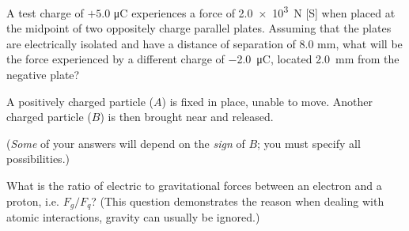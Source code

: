 \documentclass{../../ossphysics}
\begin{document}
\begin{questions}
  
  \question A test charge of $+5.0$ \si{\micro\coulomb} experiences a force of
  \SI{2.0e3}{\newton} [S] when placed at the midpoint of two oppositely
  charge parallel plates. Assuming that the plates are electrically isolated
  and have a distance of separation of 8.0 mm, what will be the
  force experienced by a different charge of \SI{-2.0}{\micro\coulomb}, located
  \SI{2.0}{\milli\metre} from the negative plate?
  \vspace{\stretch1}
  
  

  
  \question A positively charged particle ($A$) is fixed in place, unable to
  move. Another charged particle ($B$) is then brought near and released. 
  (\emph{Some} of your answers will depend on the \emph{sign} of $B$;
  you must specify all possibilities.)
  \newpage
  
  \question What is the ratio of electric to gravitational forces between an
  electron and a proton, i.e. $F_g/F_q$? (This question demonstrates the reason
  when dealing with atomic interactions, gravity can usually be ignored.)


\end{questions}
\end{document}
